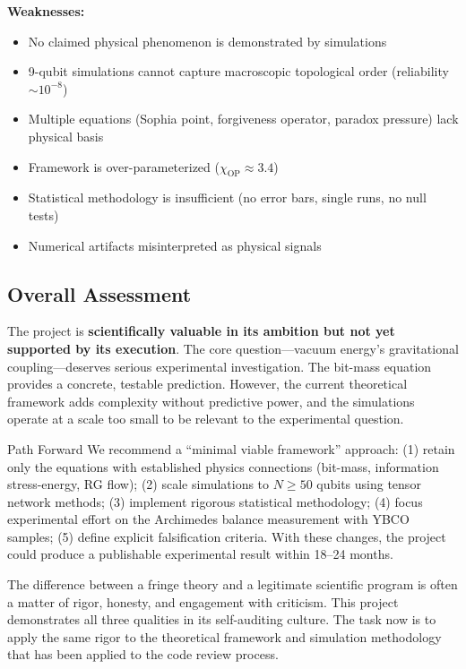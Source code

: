 \documentclass[11pt,a4paper]{article}
\begin{document}
\textbf{Weaknesses:}
\begin{itemize}[leftmargin=1.5em]
  \item No claimed physical phenomenon is demonstrated by simulations
  \item 9-qubit simulations cannot capture macroscopic topological order (reliability $\sim 10^{-8}$)
  \item Multiple equations (Sophia point, forgiveness operator, paradox pressure) lack physical basis
  \item Framework is over-parameterized ($\chi_{\text{OP}} \approx 3.4$)
  \item Statistical methodology is insufficient (no error bars, single runs, no null tests)
  \item Numerical artifacts misinterpreted as physical signals
\end{itemize}

\subsection{Overall Assessment}

The project is \textbf{scientifically valuable in its ambition but not yet supported by its execution}. The core question---vacuum energy's gravitational coupling---deserves serious experimental investigation. The bit-mass equation provides a concrete, testable prediction. However, the current theoretical framework adds complexity without predictive power, and the simulations operate at a scale too small to be relevant to the experimental question.

\begin{okbox}{Path Forward}
We recommend a ``minimal viable framework'' approach: (1) retain only the equations with established physics connections (bit-mass, information stress-energy, RG flow); (2) scale simulations to $N \geq 50$ qubits using tensor network methods; (3) implement rigorous statistical methodology; (4) focus experimental effort on the Archimedes balance measurement with YBCO samples; (5) define explicit falsification criteria. With these changes, the project could produce a publishable experimental result within 18--24 months.
\end{okbox}

The difference between a fringe theory and a legitimate scientific program is often a matter of rigor, honesty, and engagement with criticism. This project demonstrates all three qualities in its self-auditing culture. The task now is to apply the same rigor to the theoretical framework and simulation methodology that has been applied to the code review process.
\end{document}
